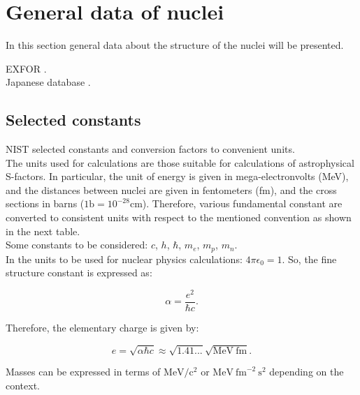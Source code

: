 \documentclass[openany]{book}
\begin{document}
\section{General data of nuclei} \label{sec:nucleiData}

In this section general data about the structure of the nuclei will be presented. 

EXFOR \cite{zerkin_pritychenko_totans_vrapcenjak_rodionov_shulyak_2022}. \\
Japanese database \cite{iwamoto_iwamoto_shibata_ichihara_kunieda_minato_nakayama_2020}.

\subsection{Selected constants} \label{sub:selectedConstants}

NIST selected constants and conversion factors to convenient units. \\

The units used for calculations are those suitable for calculations of astrophysical S-factors. In particular, the unit of energy is given in mega-electronvolts (MeV), and the distances between nuclei are given in fentometers (fm), and the cross sections in barns ($\mathrm{1b = 10^{-28}cm}$). Therefore, various fundamental constant are converted to consistent units with respect to the mentioned convention as shown in the next table. \\

Some constants to be considered: $c$, $h$, $\hbar$, $m_e$, $m_p$, $m_n$. \\

In the units to be used for nuclear physics calculations: $4\pi\epsilon_0 = 1$. So, the fine structure constant is expressed as:

\begin{equation} \label{eq:constants_alpha}
	\alpha = \frac{e^2}{\hbar c}.
\end{equation}

Therefore, the elementary charge is given by: 

\begin{equation} \label{eq:constants_e}
	e = \sqrt{\alpha\hbar c} \approx \sqrt{1.41...} \sqrt{\mathrm{MeV \ fm}}.
\end{equation}

Masses can be expressed in terms of $\mathrm{MeV/c^2}$ or $\mathrm{MeV \ {fm}^{-2} \ s^{2}}$ depending on the context.  
\end{document}
